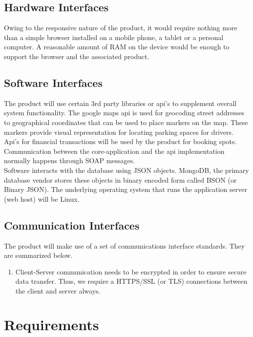 \documentclass[12pt,a4paper]{report}
\begin{document}
\section{Hardware Interfaces}
Owing to the responsive nature of the product, it would require nothing more than a simple browser installed on a mobile phone, a tablet or a personal computer. A reasonable amount of RAM on the device would be enough to support the browser and the associated product. \cite{parking_marketplace_srs}
\section{Software Interfaces}
The product will use certain 3rd party libraries or api's to supplement overall system functionality. The google maps api is used for geocoding street addresses to geographical coordinates that can be used to place markers on the map. These markers provide visual representation for locating parking spaces for drivers. Api's for financial transactions will be used by the product for booking spots. Communication between the core-application and the api implementation normally happens through SOAP messages.  \\
Software interacts with the database using JSON objects. MongoDB, the primary database vendor stores these objects in binary encoded form called BSON (or Binary JSON). The underlying operating system that runs the application server (web host) will be Linux. \cite{parking_marketplace_srs}
\section{Communication Interfaces}
The product will make use of a set of communications interface standards. They are summarized below. \cite{parking_marketplace_srs}
\begin{enumerate}
	\renewcommand{\labelenumi}{{\textbf{\arabic{enumi}.}}}
	\item Client-Server communication needs to be encrypted in order to ensure secure data transfer. Thus, we require a HTTPS/SSL (or TLS) connections between the client and server always.  
\end{enumerate}


\chapter{Requirements}
\end{document}
